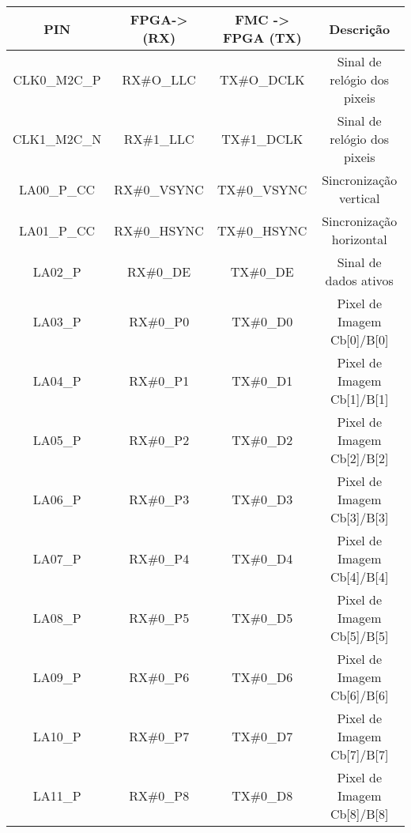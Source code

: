 \begin{longtable}[]
	{|c|c|c|c|}
	\hline
	\centering
	
	\textbf{PIN} & \textbf{FPGA-> (RX)} 			& \textbf{FMC -> FPGA (TX)} 			& \textbf{Descrição}                   \\ \hline \endhead
	CLK0\_M2C\_P & RX\#O\_LLC          				& TX\#O\_DCLK                          & Sinal de relógio dos pixeis 			\\ \hline
	CLK1\_M2C\_N & RX\#1\_LLC           			 & TX\#1\_DCLK                          & Sinal de relógio dos pixeis 			\\ \hline
	LA00\_P\_CC  & RX\#0\_VSYNC         			  & TX\#0\_VSYNC                         & Sincronização vertical         		\\ \hline
	LA01\_P\_CC  & RX\#0\_HSYNC         		  & TX\#0\_HSYNC                         & Sincronização horizontal       		\\ \hline
	LA02\_P      & RX\#0\_DE            				   & TX\#0\_DE                            & Sinal de dados ativos          		\\ \hline
	LA03\_P      & RX\#0\_P0            				   & TX\#0\_D0                            & Pixel de Imagem Cb{[}0{]}/B{[}0{]}   \\ \hline
	LA04\_P      & RX\#0\_P1            		      & TX\#0\_D1                            & Pixel de Imagem Cb{[}1{]}/B{[}1{]}   \\ \hline
	LA05\_P      & RX\#0\_P2            			      & TX\#0\_D2                            & Pixel de Imagem Cb{[}2{]}/B{[}2{]}   \\ \hline
	LA06\_P      & RX\#0\_P3            			      & TX\#0\_D3                            & Pixel de Imagem Cb{[}3{]}/B{[}3{]}   \\ \hline
	LA07\_P      & RX\#0\_P4            			      & TX\#0\_D4                            & Pixel de Imagem Cb{[}4{]}/B{[}4{]}   \\ \hline
	LA08\_P      & RX\#0\_P5            			      & TX\#0\_D5                            & Pixel de Imagem Cb{[}5{]}/B{[}5{]}   \\ \hline
	LA09\_P      & RX\#0\_P6            		     & TX\#0\_D6                            & Pixel de Imagem Cb{[}6{]}/B{[}6{]}   \\ \hline
	LA10\_P      & RX\#0\_P7            			     & TX\#0\_D7                            & Pixel de Imagem Cb{[}7{]}/B{[}7{]}   \\ \hline
	LA11\_P      & RX\#0\_P8            			     & TX\#0\_D8                            & Pixel de Imagem Cb{[}8{]}/B{[}8{]}   \\ \hline

\end{longtable}

